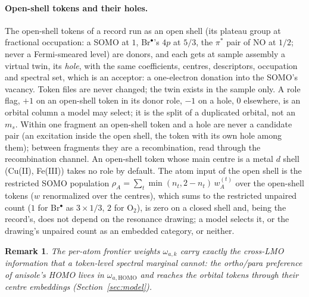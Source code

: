\documentclass[11pt,a4paper]{article}
\newtheorem{remark}{Remark}
\begin{document}
\paragraph{Open-shell tokens and their holes.} The open-shell tokens of a record run as an open shell (its plateau group at fractional occupation: a SOMO at $1$, Br$^\bullet$'s $4p$ at $5/3$, the $\pi^*$ pair of NO at $1/2$; never a Fermi-smeared level) are donors, and each gets at sample assembly a virtual twin, its \emph{hole}, with the same coefficients, centres, descriptors, occupation and spectral set, which is an acceptor: a one-electron donation into the SOMO's vacancy. Token files are never changed; the twin exists in the sample only. A role flag, $+1$ on an open-shell token in its donor role, $-1$ on a hole, $0$ elsewhere, is an orbital column a model may select; it is the split of a duplicated orbital, not an $m_s$. Within one fragment an open-shell token and a hole are never a candidate pair (an excitation inside the open shell, the token with its own hole among them); between fragments they are a recombination, read through the recombination channel. An open-shell token whose main centre is a metal $d$ shell (Cu(II), Fe(III)) takes no role by default. The atom input of the open shell is the restricted SOMO population $\rho_A=\sum_t\min(n_t,2-n_t)\,w^{(t)}_A$ over the open-shell tokens ($w$ renormalized over the centres), which sums to the restricted unpaired count ($1$ for Br$^\bullet$ as $3\times1/3$, $2$ for O$_2$), is zero on a closed shell and, being the record's, does not depend on the resonance drawing; a model selects it, or the drawing's unpaired count as an embedded category, or neither.

\begin{remark}
The per-atom frontier weights $\omega_{a,k}$ carry exactly the cross-LMO information that a token-level spectral marginal cannot: the ortho/para preference of anisole's HOMO lives in $\omega_{a,\mathrm{HOMO}}$ and reaches the orbital tokens through their centre embeddings (Section~\ref{sec:model}).
\end{remark}
\end{document}
